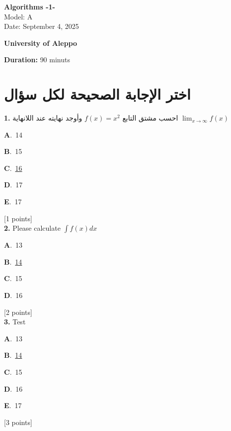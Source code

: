 \documentclass[12pt]{article}
\newcommand{\choice}[3]{%
  \noindent\textbf{#1}.~#2\hfill#3\par\vspace{0.25em}
}
\begin{document}
\begin{flushright}
{\Large \textbf{{\textenglish{Algorithms -1-}}}}\\[0.25em]
{\normalsize \textenglish{Model: }{\textenglish{A}}}\\[0.1em]
{\normalsize \textenglish{Date: }{\textenglish{September 4, 2025}}}
\end{flushright}

\vspace{0.6cm}

\noindent
\begin{minipage}[t]{0.65\textwidth}
  \raggedright
  \textbf{{\textenglish{University of Aleppo}}}\\[0.3em]
\end{minipage}\hfill
\begin{minipage}[t]{0.3\textwidth}
  \raggedleft
  \textenglish{\textbf{Duration: }}{\textenglish{90 minuts}}
\end{minipage}

\vspace{0.9cm}

\section*{اختر الإجابة الصحيحة لكل سؤال}

\noindent \textbf{\textenglish{1.}} {\textarabic{احسب مشتق التابع }}\( f(x) = x^2\){\textarabic{ وأوجد نهايته عند اللانهاية }}\(\lim_{x \to \infty}f(x)\)

\noindent\choice{A}{{\textenglish{14}}}{}
\noindent\choice{B}{{\textenglish{15}}}{}
\noindent\choice{C}{\underline{{\textenglish{16}}}}{}
\noindent\choice{D}{{\textenglish{17}}}{}
\noindent\choice{E}{{\textenglish{17}}}{}
\hfill {\textenglish{[1 points]}}\\[0.5em]

\noindent \textbf{\textenglish{2.}} {\textenglish{Please calculate }}\(\int f(x)dx\)

\noindent\choice{A}{{\textenglish{13}}}{}
\noindent\choice{B}{\underline{{\textenglish{14}}}}{}
\noindent\choice{C}{{\textenglish{15}}}{}
\noindent\choice{D}{{\textenglish{16}}}{}
\hfill {\textenglish{[2 points]}}\\[0.5em]

\noindent \textbf{\textenglish{3.}} {\textenglish{Test}}

\noindent\choice{A}{{\textenglish{13}}}{}
\noindent\choice{B}{\underline{{\textenglish{14}}}}{}
\noindent\choice{C}{{\textenglish{15}}}{}
\noindent\choice{D}{{\textenglish{16}}}{}
\noindent\choice{E}{{\textenglish{17}}}{}
\hfill {\textenglish{[3 points]}}\\[0.5em]
\end{document}
